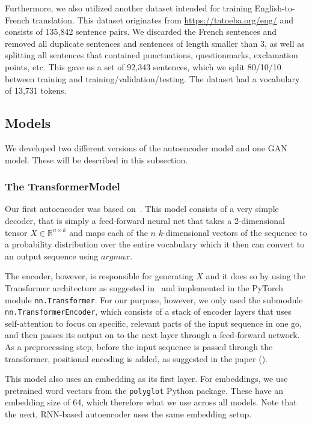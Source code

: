 \documentclass{article}
\begin{document}
Furthermore, we also utilized another dataset intended for training
English-to-French translation. This dataset originates from
\url{https://tatoeba.org/eng/} and consists of 135,842 sentence pairs. We
discarded the French sentences and removed all duplicate sentences and sentences
of length smaller than 3, as well as splitting all sentences that contained
punctuations, questionmarks, exclamation points, etc. This gave us a set of
92,343 sentences, which we split 80/10/10 between training and training/validation/testing.
 The dataset had a vocabulary of 13,731 tokens.


\subsection{Models}\label{sec:models}

We developed two different versions of the autoencoder model and one GAN model.
These will be described in this subsection.

\subsubsection{The TransformerModel}\label{sec:transformermodel}

Our first autoencoder was based on~\cite{pytorchTutorialTransformer}. This model
consists of a very simple decoder, that is simply a feed-forward neural net that
takes a 2-dimensional tensor $X \in \mathbb{R}^{n \times k}$ and maps each of
the $n$ $k$-dimensional vectors of the sequence to a probability distribution
over the entire vocabulary which it then can convert to an output sequence using
$argmax$.

The encoder, however, is responsible for generating $X$ and it does so by using
the Transformer architecture as suggested in~\cite{vaswani2017attention} and
implemented in the PyTorch module \texttt{nn.Transformer}. For our purpose,
however, we only used the submodule \texttt{nn.TransformerEncoder}, which
consists of a stack of encoder layers that uses self-attention to focus on
specific, relevant parts of the input sequence in one go, and then passes its
output on to the next layer through a feed-forward network. As a preprocessing
step, before the input sequence is passed through the transformer, positional
encoding is added, as suggested in the paper (\cite{vaswani2017attention}).

This model also uses an embedding as its first layer. For embeddings, we use
pretrained word vectors from the \texttt{polyglot} Python package. These have an
embedding size of 64, which therefore what we use across all models. Note that
the next, RNN-based autoencoder uses the same embedding setup.
\end{document}
